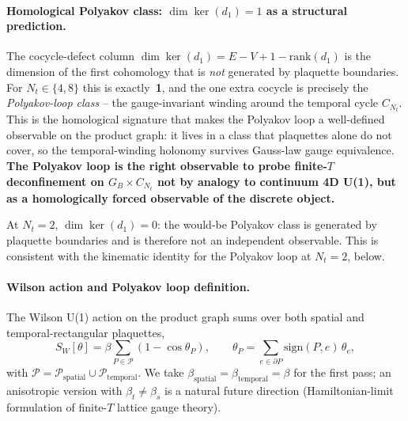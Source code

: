 \documentclass[11pt]{article}
\begin{document}
\paragraph{Homological Polyakov class: $\dim\ker(d_1)=1$ as a structural
prediction.} The cocycle-defect column $\dim\ker(d_1)=E-V+1-\mathrm{rank}(d_1)$
is the dimension of the first cohomology that is \emph{not} generated by
plaquette boundaries. For $N_t\in\{4,8\}$ this is exactly~\textbf{1}, and
the one extra cocycle is precisely the \emph{Polyakov-loop class} -- the
gauge-invariant winding around the temporal cycle $C_{N_t}$. This is the
homological signature that makes the Polyakov loop a well-defined
observable on the product graph: it lives in a class that plaquettes alone
do not cover, so the temporal-winding holonomy survives Gauss-law gauge
equivalence. \textbf{The Polyakov loop is the right observable to probe
finite-$T$ deconfinement on $G_B\times C_{N_t}$ not by analogy to continuum
4D U(1), but as a homologically forced observable of the discrete object.}

At $N_t=2$, $\dim\ker(d_1)=0$: the would-be Polyakov class is generated by
plaquette boundaries and is therefore not an independent observable.
This is consistent with the kinematic identity for the Polyakov loop at
$N_t=2$, below.

\paragraph{Wilson action and Polyakov loop definition.} The Wilson U(1)
action on the product graph sums over both spatial and
temporal-rectangular plaquettes,
\begin{equation}
S_W[\theta]=\beta\sum_{P\in\mathcal{P}}(1-\cos\theta_P),
\qquad\theta_P=\sum_{e\in\partial P}\mathrm{sign}(P,e)\,\theta_e,
\label{eq:wilson_product}
\end{equation}
with $\mathcal{P}=\mathcal{P}_\text{spatial}\cup\mathcal{P}_\text{temporal}$.
We take $\beta_\text{spatial}=\beta_\text{temporal}=\beta$ for the first pass;
an anisotropic version with $\beta_t\ne\beta_s$ is a natural future direction
(Hamiltonian-limit formulation of finite-$T$ lattice gauge theory).
\end{document}
